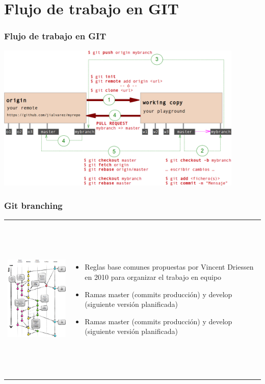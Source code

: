 \section{Flujo de trabajo en GIT}
\frame
{
\frametitle{Flujo de trabajo en GIT}
\begin{center}
 \includegraphics[height=7cm]{imgs/gitworkflow.png}
\end{center}
}

\frame
{
\frametitle{Git branching}

\begin{tabular}[t]{m{5cm}m{6cm}}
   \includegraphics[height=8cm]{imgs/gitbranching.png} 
   &
   \begin{itemize}
    \addtolength{\itemindent}{0.4cm}
    \item Reglas base comunes propuestas por Vincent Driessen en 2010 para organizar el trabajo en equipo
    \item Ramas master (commits producción) y develop (siguiente versión planificada)
    \item Ramas master (commits producción) y develop (siguiente versión planificada)
   \end{itemize}
\end{tabular}
}

